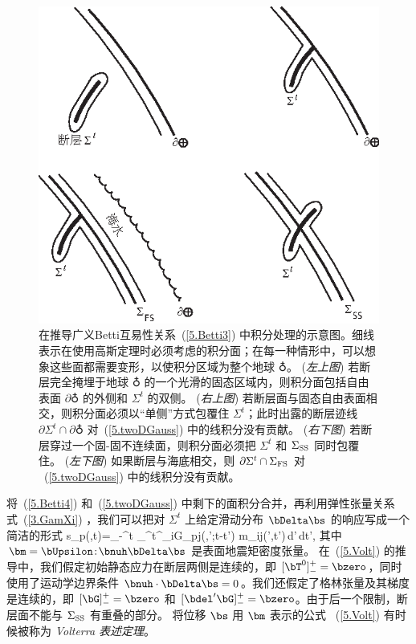 \begin{figure}[!t]
\begin{center}
\includegraphics{../figures/chap05/fig06.eps}
\end{center}
\caption[integrationpaths]{\label{fig5.6}
在推导广义Betti互易性关系~(\ref{5.Betti3}) 中积分处理的示意图。细线表示在使用高斯定理时必须考虑的积分面；在每一种情形中，可以想象这些面都需要变形，以使积分区域为整个地球 $\earth$。  ({\em 左上图}) 若断层完全掩埋于地球 $\earth$ 的一个光滑的固态区域内，则积分面包括自由表面 $\partial\earth$ 的外侧和 $\Sigma^t$ 的双侧。  ({\em 右上图}) 若断层面与固态自由表面相交，则积分面必须以“单侧”方式包覆住 $\Sigma^t$；此时出露的断层迹线 $\partial\Sigma^t\cap\partial\earth$ 对~(\ref{5.twoDGauss}) 中的线积分没有贡献。 ({\em 右下图})
若断层穿过一个固-固不连续面，则积分面必须把
$\Sigma^t$ 和 $\Sigma_{\rm SS}$ 同时包覆住。
({\em 左下图}) 如果断层与海底相交，则 $\partial\Sigma^t\cap\Sigma_{\rm FS}$ 对
~(\ref{5.twoDGauss}) 中的线积分没有贡献。}
\end{figure}
将~(\ref{5.Betti4}) 和~(\ref{5.twoDGauss}) 中剩下的面积分合并，再利用弹性张量关系式~(\ref{3.GamXi}) ，我们可以把对 $\Sigma^t$ 上给定滑动分布 
$\bDelta\bs$ 的响应写成一个简洁的形式
\eq
\label{5.Volt}
s_p(\bx,t)=\int_{-\infty}^{t}
\int_{\Sigma^t}\p^{\prime}_iG_{pj}(\bx,\bx';t-t')
m_{ij}(\bx',t')\,d\/\Sigma'\,dt',
\en
其中 $\bm=\bUpsilon\!:\!\bnuh\bDelta\bs$ 是表面地震矩密度张量。
在~(\ref{5.Volt}) 的推导中，我们假定初始静态应力在断层两侧是连续的，即
$[\bT^0]^+_-=\bzero$，同时使用了运动学边界条件
$\bnuh\cdot\bDelta\bs=0$。我们还假定了格林张量及其梯度是连续的，即 $[\bG]^+_-=\bzero$ 和
$[\bdel^{\prime}\bG]^+_-=\bzero$。由于后一个限制，断层面不能与 $\Sigma_{\rm SS}$ 有重叠的部分。
将位移 $\bs$ 用 $\bm$ 表示的公式
~(\ref{5.Volt}) 有时候被称为
{\em Volterra 表述定理\/}。
%

